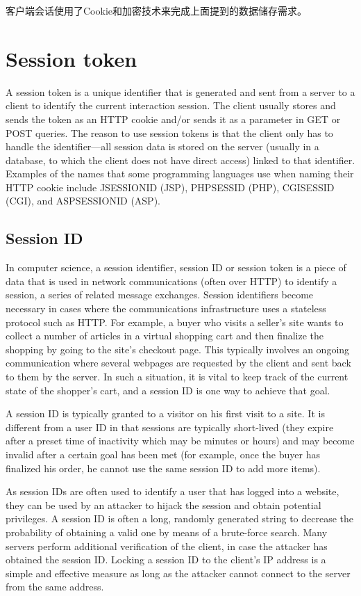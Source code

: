客户端会话使用了Cookie和加密技术来完成上面提到的数据储存需求。



\chapter{Session token}


A session token is a unique identifier that is generated and sent from a server to a client to identify the current interaction session. The client usually stores and sends the token as an HTTP cookie and/or sends it as a parameter in GET or POST queries. The reason to use session tokens is that the client only has to handle the identifier—all session data is stored on the server (usually in a database, to which the client does not have direct access) linked to that identifier. Examples of the names that some programming languages use when naming their HTTP cookie include JSESSIONID (JSP), PHPSESSID (PHP), CGISESSID (CGI), and ASPSESSIONID (ASP).

\section{Session ID}

In computer science, a session identifier, session ID\cite{session_id} or session token is a piece of data that is used in network communications (often over HTTP) to identify a session, a series of related message exchanges. Session identifiers become necessary in cases where the communications infrastructure uses a stateless protocol such as HTTP. For example, a buyer who visits a seller's site wants to collect a number of articles in a virtual shopping cart and then finalize the shopping by going to the site's checkout page. This typically involves an ongoing communication where several webpages are requested by the client and sent back to them by the server. In such a situation, it is vital to keep track of the current state of the shopper's cart, and a session ID is one way to achieve that goal.


A session ID is typically granted to a visitor on his first visit to a site. It is different from a user ID in that sessions are typically short-lived (they expire after a preset time of inactivity which may be minutes or hours) and may become invalid after a certain goal has been met (for example, once the buyer has finalized his order, he cannot use the same session ID to add more items).

As session IDs are often used to identify a user that has logged into a website, they can be used by an attacker to hijack the session and obtain potential privileges. A session ID is often a long, randomly generated string to decrease the probability of obtaining a valid one by means of a brute-force search. Many servers perform additional verification of the client, in case the attacker has obtained the session ID. Locking a session ID to the client's IP address is a simple and effective measure as long as the attacker cannot connect to the server from the same address.

